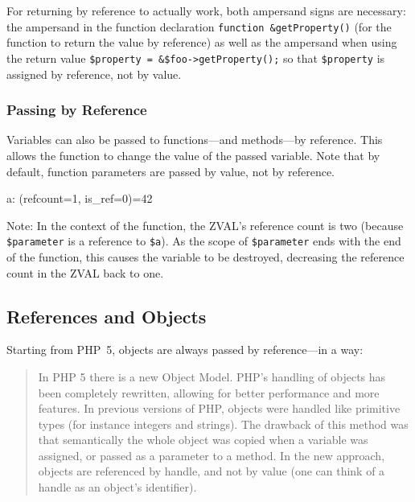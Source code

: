 
For returning by reference to actually work, both ampersand signs are necessary: the ampersand in the function declaration \texttt{function \&getProperty()} (for the function to return the value by reference) as well as the ampersand when using the return value \texttt{\$property = \&\$foo->getProperty();} so that \texttt{\$property} is assigned by reference, not by value.


\subsubsection{Passing by Reference}

Variables can also be passed to functions---and methods---by reference. \cite{php-manual-passing-by-reference} This allows the function to change the value of the passed variable. Note that by default, function parameters are passed by value, not by reference.


\begin{textcode}
a: (refcount=1, is_ref=0)=42
\end{textcode}

Note: In the context of the function, the ZVAL's reference count is two (because \texttt{\$parameter} is a reference to \texttt{\$a}). As the scope of \texttt{\$parameter} ends with the end of the function, this causes the variable to be destroyed, decreasing the reference count in the ZVAL back to one.


\subsection{References and Objects}
\label{object-references}

Starting from PHP~5, objects are always passed by reference---in a way:~\cite{php-manual-migration5-oop, php-src-rfc-object-handles}

\begin{quote}
In PHP 5 there is a new Object Model. PHP's handling of objects has been completely rewritten, allowing for better performance and more features. In previous versions of PHP, objects were handled like primitive types (for instance integers and strings). The drawback of this method was that semantically the whole object was copied when a variable was assigned, or passed as a parameter to a method. In the new approach, objects are referenced by handle, and not by value (one can think of a handle as an object's identifier).
\end{quote}

